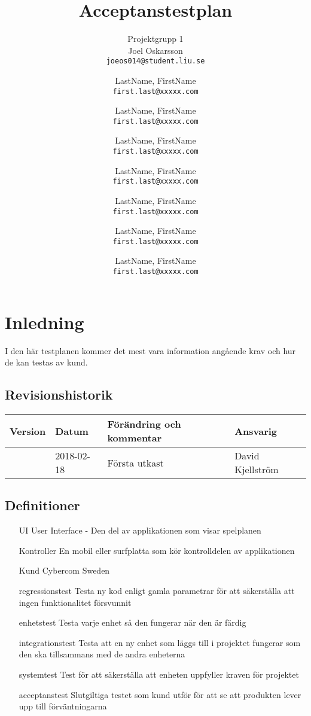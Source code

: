 \documentclass[10pt]{article}
\title{Acceptanstestplan}
\author{
	Projektgrupp 1\\
	Joel Oskarsson\\
	\texttt{joeos014@student.liu.se}
	\and
	LastName, FirstName\\
	\texttt{first.last@xxxxx.com}
	\and
	LastName, FirstName\\
	\texttt{first.last@xxxxx.com}
	\and
	LastName, FirstName\\
	\texttt{first.last@xxxxx.com}
	\and
	LastName, FirstName\\
	\texttt{first.last@xxxxx.com}
  	\and
  	LastName, FirstName\\
  	\texttt{first.last@xxxxx.com}
  	\and
  	LastName, FirstName\\
  	\texttt{first.last@xxxxx.com}
  	\and
  	LastName, FirstName\\
  	\texttt{first.last@xxxxx.com}
}
\begin{document}
\maketitle
\pagebreak
\tableofcontents
\pagebreak
\section{Inledning}
	I den här testplanen kommer det mest vara information angående krav och hur de kan testas av kund.
	\subsection{Revisionshistorik}

	
	\begin{center}
 	   \begin{tabular}{| l | l | l |  l | }
 	       \hline
 	       \textbf{Version} & \textbf{Datum} & \textbf{Förändring och kommentar} & \textbf{Ansvarig} \\
 	       \hline
 	       \centering 0.1 & 2018-02-18 & Första utkast & David Kjellström\\
 	       \hline
 	   \end{tabular}
	\end{center}


	\subsection{Definitioner}
		\begin{itemize}
		\item [UI] User Interface - Den del av applikationen som visar spelplanen
		\item [Kontroller] En mobil eller surfplatta som kör kontrolldelen av applikationen
		\item [Kund] Cybercom Sweden
		\item [regressionstest] Testa ny kod enligt gamla parametrar för att säkerställa att ingen funktionalitet försvunnit
		\item [enhetstest] Testa varje enhet så den fungerar när den är färdig
		\item [integrationstest] Testa att en ny enhet som läggs till i projektet fungerar som den ska tillsammans med de andra enheterna
		\item [systemtest] Test för att säkerställa att enheten uppfyller kraven för projektet
		\item [acceptanstest] Slutgiltiga testet som kund utför för att se att produkten lever upp till förväntningarna
		\end{itemize}
	
\end{document}
